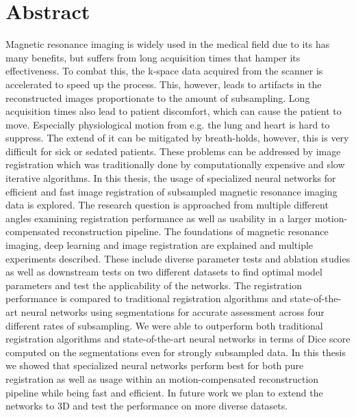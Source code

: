 \chapter*{Abstract}
Magnetic resonance imaging is widely used in the medical field due to its has many benefits, but suffers from long acquisition times that hamper its effectiveness. To combat this, the k-space data acquired from the scanner is accelerated to speed up the process. This, however, leads to artifacts in the reconstructed images proportionate to the amount of subsampling. Long acquisition times also lead to patient discomfort, which can cause the patient to move. Especially physiological motion from e.g. the lung and heart is hard to suppress. The extend of it can be mitigated by breath-holds, however, this is very difficult for sick or sedated patients. These problems can be addressed by image registration which was traditionally done by computationally expensive and slow iterative algorithms. In this thesis, the usage of specialized neural networks for efficient and fast image registration of subsampled magnetic resonance imaging data is explored. The research question is approached from multiple different angles examining registration performance as well as usability in a larger motion-compensated reconstruction pipeline. The foundations of magnetic resonance imaging, deep learning and image registration are explained and multiple experiments described. These include diverse parameter tests and ablation studies as well as downstream tests on two different datasets to find optimal model parameters and test the applicability of the networks. The registration performance is compared to traditional registration algorithms and state-of-the-art neural networks using segmentations for accurate assessment across four different rates of subsampling. We were able to outperform both traditional registration algorithms and state-of-the-art neural networks in terms of Dice score computed on the segmentations even for strongly subsampled data. In this thesis we showed that specialized neural networks perform best for both pure registration as well as usage within an motion-compensated reconstruction pipeline while being fast and efficient. In future work we plan to extend the networks to 3D and test the performance on more diverse datasets.

